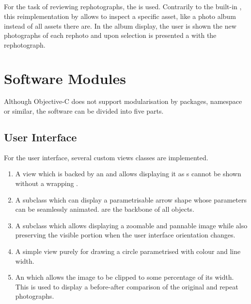 \subsection{}

For the task of reviewing rephotographs, the  is
used. Contrarily to the built-in , this
reimplementation by \citet{nutting2013} allows to inspect a specific asset, like
a photo album instead of all assets there are. In the album display, the user is
shown the new photographs of each rephoto and upon selection is presented a
 with the rephotograph.


\section{Software Modules}

Although Objective-C does not support modularisation by packages, namespace or
similar, the software can be divided into five parts.

\subsection{User Interface}

For the user interface, several custom views classes are implemented.
\begin{enumerate}
   \item {} A view which is backed by an  and
      allows displaying it as s cannot be shown without a
      wrapping .
   \item {} A  subclass which can display a
      parametrisable arrow shape whose parameters can be seamlessly animated.
       are the backbone of all  objects.
   \item {} A  subclass which allows
      displaying a zoomable and pannable image while also preserving the visible
      portion when the user interface orientation changes.
   \item {} A simple view purely for drawing a circle parametrised
      with colour and line width.
   \item {} An  which allows the
      image to be clipped to some percentage of its width. This is used to
      display a before-after comparison of the original and repeat photographs.
\end{enumerate}


